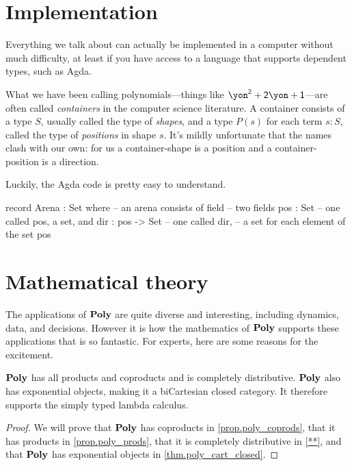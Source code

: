 \documentclass[Book-Poly]{subfiles}
\begin{document}
\section{Implementation} \label{sec.poly.intro.code}

Everything we talk about can actually be implemented in a computer without much difficulty, at least if you have access to a language that supports dependent types, such as Agda.

What we have been calling polynomials---things like $\yon^\2+\2\yon+\1$---are often called \emph{containers} in the computer science literature. A container consists of a type $S$, usually called the type of \emph{shapes}, and a type $P(s)$ for each term $s:S$, called the type of \emph{positions} in shape $s$. It's mildly unfortunate that the names clash with our own: for us a container-shape is a position and a container-position is a direction.

Luckily, the Agda code is pretty easy to understand.
\begin{agda}
record Arena : Set where  -- an arena consists of 
   field                      -- two fields
     pos : Set                -- one called pos, a set, and
     dir : pos -> Set         -- one called dir,
                              -- a set for each element of the set pos
\end{agda}

\section{Mathematical theory} \label{sec.poly.intro.math_theory}

The applications of $\mathbf{Poly}$ are quite diverse and interesting, including dynamics, data, and decisions. However it is how the mathematics of $\mathbf{Poly}$ supports these applications that is so fantastic. For experts, here are some reasons for the excitement.

\begin{proposition}
$\mathbf{Poly}$ has all products and coproducts and is completely distributive.
$\mathbf{Poly}$ also has exponential objects, making it a biCartesian closed category.
It therefore supports the simply typed lambda calculus.
\end{proposition}
\begin{proof}
We will prove that $\mathbf{Poly}$ has coproducts in \cref{prop.poly_coprods}, that it has products in \cref{prop.poly_prods}, that it is completely distributive in \cref{**}, and that $\mathbf{Poly}$ has exponential objects in \cref{thm.poly_cart_closed}.
\end{proof}
\end{document}
